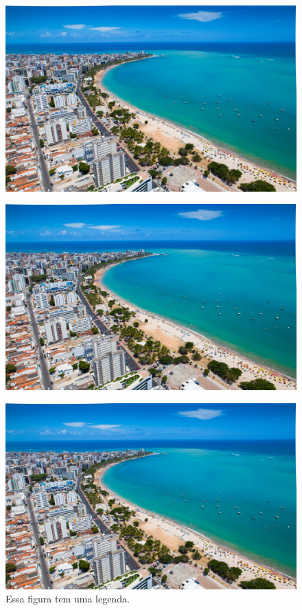 \documentclass{abntex2}
\begin{document}
\begin{figure}[h]
	\centering
	\includegraphics[scale=0.1]{maceio.jpg}
\end{figure}

\begin{figure}[h]
	\flushright
	\includegraphics[scale=0.1]{maceio.jpg}
\end{figure}

\begin{figure}[h]
	\centering
	\includegraphics[scale=0.1]{maceio.jpg}
	\caption{Essa figura tem uma legenda.}
\end{figure}
\end{document}
